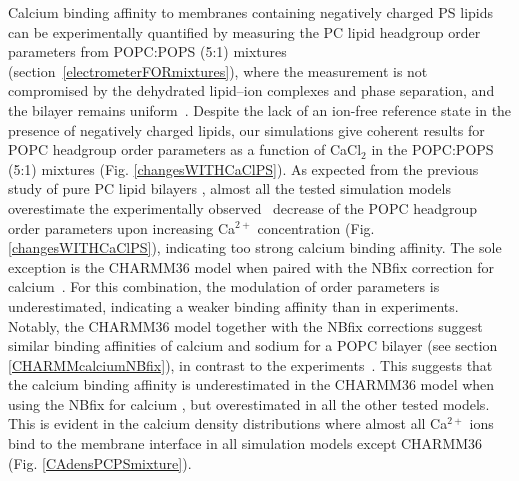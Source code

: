 \documentclass[journal=jpcbfk,manuscript=article]{achemso}
\begin{document}
Calcium binding affinity to membranes containing negatively charged PS lipids can be
experimentally quantified by measuring the PC lipid headgroup order parameters
from POPC:POPS (5:1) mixtures (section~\ref{electrometerFORmixtures}),
where the measurement is not compromised by the dehydrated lipid--ion complexes and phase separation, and the bilayer remains uniform~\cite{feigenson86,mattai89,roux90,roux91}.
Despite the lack of an ion-free reference state
in the presence of negatively charged lipids, our simulations give
coherent results for POPC headgroup order parameters as a function of
CaCl$_2$ in the POPC:POPS (5:1) mixtures (Fig. \ref{changesWITHCaClPS}).
As expected from the previous study of pure PC lipid
bilayers \cite{catte16}, almost all the tested simulation models overestimate the
experimentally observed~\cite{roux90} decrease of the POPC headgroup order parameters upon increasing Ca$^{2+}$ concentration (Fig. \ref{changesWITHCaClPS}),
indicating too strong calcium binding affinity.
The sole exception is the CHARMM36 model when paired with the NBfix
correction for calcium~\cite{kim16}. For this combination, the modulation of order parameters is underestimated, 
indicating a weaker binding affinity than in experiments.
Notably, the CHARMM36 model together with the NBfix corrections \cite{venable13,kim16} suggest similar binding affinities of
calcium and sodium for a POPC bilayer (see section \ref{CHARMMcalciumNBfix}), in contrast to the experiments~\cite{cevc90,akutsu81,altenbach84}. This suggests that the calcium binding affinity
is underestimated in the CHARMM36 model when using the NBfix for calcium \cite{kim16}, but overestimated 
in all the other tested models. This is evident in the calcium density distributions where almost all Ca$^{2+}$ ions bind to the membrane interface in all simulation models except CHARMM36 (Fig. \ref{CAdensPCPSmixture}).
\end{document}

